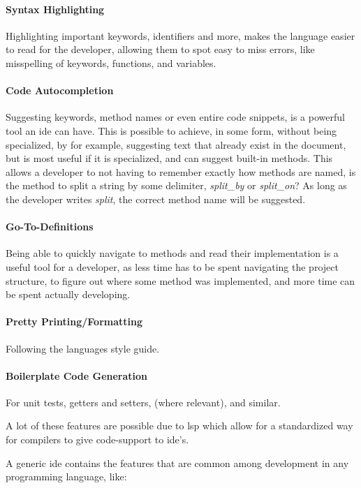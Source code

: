 \paragraph{Syntax Highlighting} Highlighting important keywords, identifiers
and more, makes the language easier to read for the developer, allowing them to
spot easy to miss errors, like misspelling of keywords, functions, and
variables.

\paragraph{Code Autocompletion} Suggesting keywords, method names or even entire
code snippets, is a powerful tool an \gls{ide} can have. This is possible to
achieve, in some form, without being specialized, by for example, suggesting
text that already exist in the document, but is most useful if it is
specialized, and can suggest built-in methods. This allows a developer to not
having to remember exactly how methods are named, is the method to split a
string by some delimiter, \textit{split\_by} or \textit{split\_on}? As long as
the developer writes \textit{split}, the correct method name will be suggested.

\paragraph{Go-To-Definitions} Being able to quickly navigate to methods and read
their implementation is a useful tool for a developer, as less time has to be
spent navigating the project structure, to figure out where some method was
implemented, and more time can be spent actually developing.

\paragraph{Pretty Printing/Formatting} Following the languages style guide.

\paragraph{Boilerplate Code Generation} For unit tests, getters and setters,
(where relevant), and similar.

A lot of these features are possible due to \gls{lsp} which allow for a
standardized way for compilers to give code-support to \gls{ide}'s.

A generic \gls{ide} contains the features that are common among development in
any programming language, like:

